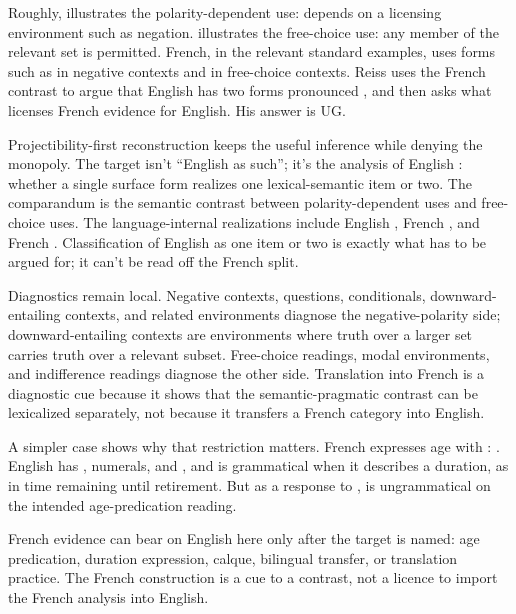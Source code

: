 \documentclass[12pt]{article}
\begin{document}
Roughly,  illustrates the polarity-dependent use:  depends on a licensing environment such as negation.  illustrates the free-choice use: any member of the relevant set is permitted. French, in the relevant standard examples, uses forms such as  in negative contexts and  in free-choice contexts. Reiss uses the French contrast to argue that English has two forms pronounced , and then asks what licenses French evidence for English. His answer is UG.

Projectibility-first reconstruction keeps the useful inference while denying the monopoly. The target isn't \enquote{English as such}; it's the analysis of English : whether a single surface form realizes one lexical-semantic item or two. The comparandum is the semantic contrast between polarity-dependent uses and free-choice uses. The language-internal realizations include English , French , and French . Classification of English  as one item or two is exactly what has to be argued for; it can't be read off the French split.

Diagnostics remain local. Negative contexts, questions, conditionals, downward-entailing contexts, and related environments diagnose the negative-polarity side; downward-entailing contexts are environments where truth over a larger set carries truth over a relevant subset. Free-choice readings, modal environments, and indifference readings diagnose the other side. Translation into French is a diagnostic cue because it shows that the semantic-pragmatic contrast can be lexicalized separately, not because it transfers a French category into English.

A simpler case shows why that restriction matters. French expresses age with : . English has , numerals, and , and  is grammatical when it describes a duration, as in time remaining until retirement. But as a response to ,  is ungrammatical on the intended age-predication reading.

French evidence can bear on English here only after the target is named: age predication, duration expression, calque, bilingual transfer, or translation practice. The French construction is a cue to a contrast, not a licence to import the French analysis into English.
\end{document}
